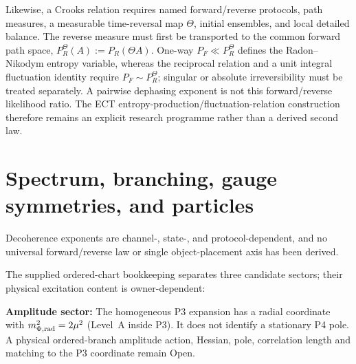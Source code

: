 \documentclass[11pt,a4paper]{article}
\begin{document}
Likewise, a Crooks relation requires named forward/reverse protocols, path
measures, a measurable time-reversal map $\Theta$, initial ensembles, and
local detailed balance.  The reverse measure must first be transported to
the common forward path space,
$P_R^\Theta(A):=P_R(\Theta A)$.  One-way $P_F\ll P_R^\Theta$ defines the
Radon--Nikodym entropy variable, whereas the reciprocal relation and a unit
integral fluctuation identity require $P_F\sim P_R^\Theta$; singular or
absolute irreversibility must be treated separately.  A pairwise dephasing
exponent is not this forward/reverse likelihood ratio.  The ECT
entropy-production/fluctuation-relation construction therefore remains an
explicit research programme rather than a derived second law.

\section{Spectrum, branching, gauge symmetries, and particles}
\label{sec:pop_spectrum_etc}

Decoherence exponents are channel-, state-, and protocol-dependent, and no universal forward/reverse law or single object-placement axis has been derived.

The supplied ordered-chart bookkeeping separates three candidate sectors;
their physical excitation content is owner-dependent:

\textbf{Amplitude sector:} The homogeneous P3 expansion has a radial
coordinate with $m_{\Phi,{\rm rad}}^2=2\mu^2$ (Level~A inside P3).
It does not identify a stationary P4 pole.  A physical ordered-branch
amplitude action, Hessian, pole, correlation length and matching to the P3
coordinate remain Open.
\end{document}

